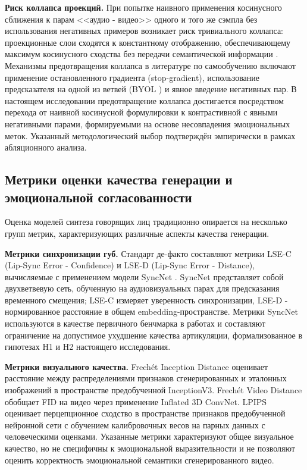 \documentclass[a4paper, 12pt, oneside, openany]{article}
\begin{document}
\textbf{Риск коллапса проекций.} При попытке наивного применения косинусного сближения к парам <<аудио - видео>> одного и того же сэмпла без использования негативных примеров возникает риск тривиального коллапса: проекционные слои сходятся к константному отображению, обеспечивающему максимум косинусного сходства без передачи семантической информации \cite{chen2021simsiam}. Механизмы предотвращения коллапса в литературе по самообучению включают применение остановленного градиента (stop-gradient), использование предсказателя на одной из ветвей (BYOL \cite{grill2020byol}) и явное введение негативных пар. В настоящем исследовании предотвращение коллапса достигается посредством перехода от наивной косинусной формулировки к контрастивной с явными негативными парами, формируемыми на основе несовпадения эмоциональных меток. Указанный методологический выбор подтверждён эмпирически в рамках абляционного анализа.

\subsection{Метрики оценки качества генерации и эмоциональной согласованности}

Оценка моделей синтеза говорящих лиц традиционно опирается на несколько групп метрик, характеризующих различные аспекты качества генерации.

\textbf{Метрики синхронизации губ.} Стандарт де-факто составляют метрики LSE-C (Lip-Sync Error - Confidence) и LSE-D (Lip-Sync Error - Distance), вычисляемые с применением модели SyncNet \cite{chung2016syncnet}. SyncNet представляет собой двухветвевую сеть, обученную на аудиовизуальных парах для предсказания временного смещения; LSE-C измеряет уверенность синхронизации, LSE-D - нормированное расстояние в общем embedding-пространстве. Метрики SyncNet используются в качестве первичного бенчмарка в работах \cite{prajwal2020wav2lip,zhang2023sadtalker,ye2023geneface} и составляют ограничение на допустимое ухудшение качества артикуляции, формализованное в гипотезах H1 и H2 настоящего исследования.

\textbf{Метрики визуального качества.} Frechét Inception Distance \cite{heusel2017fid} оценивает расстояние между распределениями признаков сгенерированных и эталонных изображений в пространстве предобученной InceptionV3. Frechét Video Distance \cite{unterthiner2018fvd} обобщает FID на видео через применение Inflated 3D ConvNet. LPIPS \cite{zhang2018lpips} оценивает перцепционное сходство в пространстве признаков предобученной нейронной сети с обучением калибровочных весов на парных данных с человеческими оценками. Указанные метрики характеризуют общее визуальное качество, но не специфичны к эмоциональной выразительности и не позволяют оценить корректность эмоциональной семантики сгенерированного видео.
\end{document}
